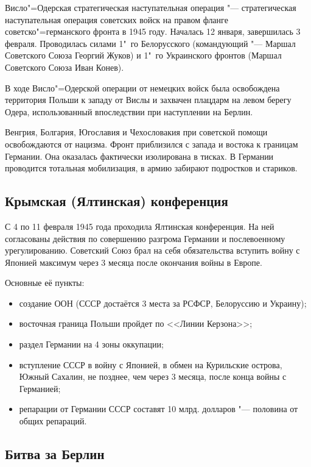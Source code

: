 Висло"=Одерская стратегическая наступательная операция "--- стратегическая наступательная операция советских войск на правом фланге советско"=германского фронта в 1945 году. Началась 12 января, завершилась 3 февраля. Проводилась силами 1"~го Белорусского (командующий "--- Маршал Советского Союза Георгий Жуков) и 1"~го Украинского фронтов (Маршал Советского Союза Иван Конев).

В ходе Висло"=Одерской операции от немецких войск была освобождена территория Польши к западу от Вислы и захвачен плацдарм на левом берегу Одера, использованный впоследствии при наступлении на Берлин. 

Венгрия, Болгария, Югославия и Чехословакия при советской помощи освобождаются от нацизма. Фронт приблизился с запада и востока к границам Германии. Она оказалась фактически изолирована в тисках. В Германии проводится тотальная мобилизация, в армию забирают подростков и стариков.


\subsection{Крымская (Ялтинская) конференция}

С 4 по 11 февраля 1945 года проходила Ялтинская конференция. На ней согласованы действия по совершению разгрома Германии и послевоенному урегулированию. Советский Союз брал на себя обязательства вступить войну с Японией максимум через 3 месяца после окончания войны в Европе.

Основные её пункты:

\begin{itemize}
    \item создание ООН (СССР достаётся 3 места за РСФСР, Белоруссию и Украину);
    \item восточная граница Польши пройдет по <<Линии Керзона>>;
    \item раздел Германии на 4 зоны оккупации;
    \item вступление СССР в войну с Японией, в обмен на Курильские острова, Южный Сахалин, не позднее, чем через 3 месяца, после конца войны с Германией;
    \item репарации от Германии СССР составят 10 млрд. долларов "--- половина от общих репараций.
\end{itemize}

\subsection{Битва за Берлин}

